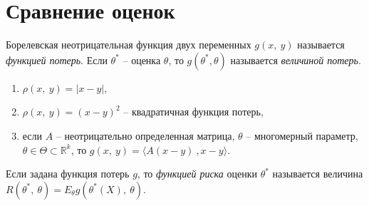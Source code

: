     \section{Сравнение оценок}
    \begin{definition}
    Борелевская неотрицательная функция двух переменных $\displaystyle g(x,\ y)$ называется \textit{функцией потерь}. Если $\displaystyle \theta ^{*}$ -- оценка $\displaystyle \theta $, то $\displaystyle g\left( \theta ^{*} ,\theta \right)$ называется \textit{величиной потерь}.
    \end{definition}
    \begin{example}
    \begin{enumerate}\
        \item $\displaystyle \rho (x,\ y) =| x-y| $,
        \item $\displaystyle \rho (x,\ y) =( x-y)^{2}$ -- квадратичная функция потерь,
        \item если $\displaystyle A$ -- неотрицательно определенная матрица, $\displaystyle \theta $ -- многомерный параметр, $\displaystyle \theta \in \Theta \subset \mathbb{R}^{k}$, то $\displaystyle g(x,\ y) =\langle A( x-y)\ ,x-y\rangle $.
    \end{enumerate}
    
    \end{example}
    \begin{definition}
    Если задана функция потерь $\displaystyle g$, то \textit{функцией риска} оценки $\displaystyle \theta ^{*}$ называется величина $\displaystyle R\left( \theta ^{*},\ \theta \right) =E_{\theta } g\left( \theta ^{*}( X),\ \theta \right)$.
    \end{definition}
